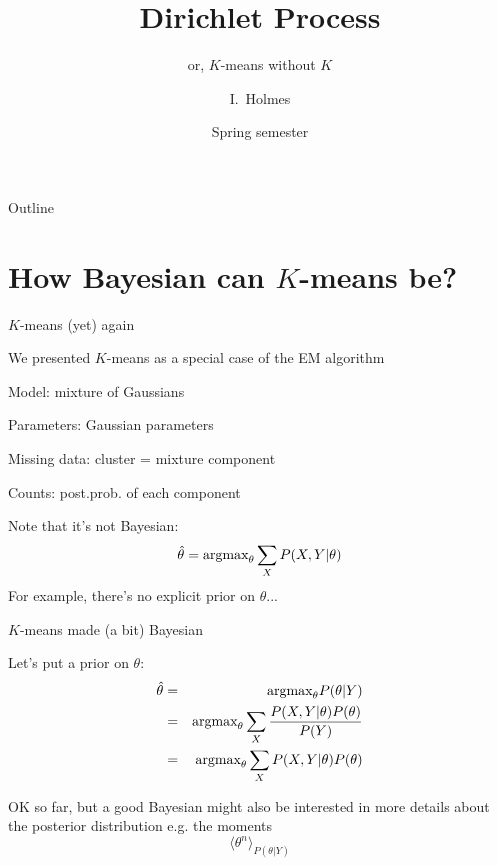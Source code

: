 \documentclass{beamer}
\title[Dirichlet process] %
{Dirichlet Process}
\subtitle
{or, $K$-means without $K$} %
\author%
{I.~Holmes} %
\institute[University of California, Berkeley] %
{
  Department of Bioengineering\\
  University of California, Berkeley}
\date%
{Spring semester}
\begin{document}
\begin{frame}
  \titlepage
\end{frame}

\begin{frame}{Outline}
  \tableofcontents
\end{frame}

\section{How Bayesian can $K$-means be?}

\begin{frame}{$K$-means (yet) again}

We presented $K$-means as a special case of the EM algorithm
\itemb
\item Model: \alert{mixture of Gaussians}
\item Parameters: Gaussian parameters
\item Missing data: cluster = mixture component
\item Counts: post.prob. of each component
\iteme

\vspace{\baselineskip}

Note that it's not Bayesian:
\[
\hat{\theta} = \mbox{argmax}_{\theta} \sum_X P(X,Y|\theta)
\]
For example, there's no explicit prior on $\theta$...

\end{frame}


\begin{frame}{$K$-means made (a bit) Bayesian}

Let's put a prior on $\theta$:
\begin{eqnarray*}
\hat{\theta} & = & \mbox{argmax}_{\theta} P(\theta|Y) \\
& = & \mbox{argmax}_{\theta} \sum_X \frac{P(X,Y|\theta) P(\theta)}{P(Y)} \\
& = & \mbox{argmax}_{\theta} \sum_X P(X,Y|\theta) P(\theta)
\end{eqnarray*}

OK so far, but a good Bayesian might also be interested in more details about the posterior distribution e.g. the moments
\[
\langle \theta^n \rangle_{P(\theta|Y)}
\]

\end{frame}
\end{document}
